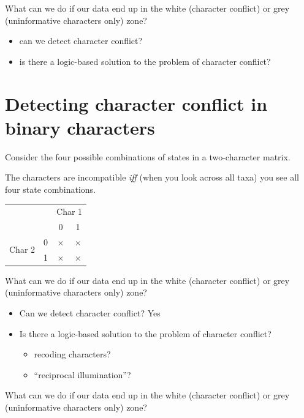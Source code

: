 \documentclass[landscape]{foils}
\begin{document}
\myNewSlide
What can we do if our data end up in the white (character conflict) or grey (uninformative characters only) zone?

\begin{itemize}
	\item can we detect character conflict?
	\item is there a logic-based solution to the problem of character conflict?
\end{itemize}

\myNewSlide
\section*{Detecting character conflict in binary characters}
Consider the four possible combinations of states in a two-character matrix.

The characters are incompatible {\em iff} (when you look across all taxa) you see all four state combinations.

\begin{table}[htdp]
\begin{center}
\begin{tabular}{|lc|c|c|}
\hline
& & \multicolumn{2}{c|}{Char 1} \\
& & 0 & 1\\
\hline
\multirow{2}{*}{Char 2} & 0 & $\times$ & $\times$ \\
& 1 & $\times$ & $\times$ \\
\hline
\end{tabular}
\end{center}
\label{default}
\end{table}

\myNewSlide
What can we do if our data end up in the white (character conflict) or grey (uninformative characters only) zone?

\begin{itemize}
	\item {\color{grey} Can we detect character conflict? Yes}
	\item Is there a logic-based solution to the problem of character conflict?
	\begin{itemize}
		\item recoding characters? 
	   \item ``reciprocal illumination''?
	\end{itemize}	
\end{itemize}

\myNewSlide
What can we do if our data end up in the white (character conflict) or grey (uninformative characters only) zone?
\end{document}
